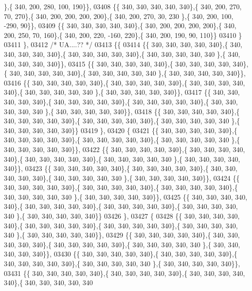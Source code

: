 \begin{DoxyCode}
      \},\{ 340, 200, 280, 100, 190\}\},
03408 \{\{ 340, 340, 340, 340, 340\},\{ 340, 200, 270,  70, 270\},\{ 340, 200, 200, 200, 200\},\{ 340, 200, 270,  30, 230
      \},\{ 340, 200, 100, -290,  90\}\},
03409 \{\{ 340, 340, 340, 340, 340\},\{ 340, 200, 200, 200, 200\},\{ 340, 200, 250,  70, 160\},\{ 340, 200, 220, -160, 
      220\},\{ 340, 200, 190,  90, 110\}\}
03410 \}
03411 \},
03412 \textcolor{comment}{/* UA....?? */}
03413 \{\{
03414 \{\{ 340, 340, 340, 340, 340\},\{ 340, 340, 340, 340, 340\},\{ 340, 340, 340, 340, 340\},\{ 340, 340, 340, 340, 340
      \},\{ 340, 340, 340, 340, 340\}\},
03415 \{\{ 340, 340, 340, 340, 340\},\{ 340, 340, 340, 340, 340\},\{ 340, 340, 340, 340, 340\},\{ 340, 340, 340, 340, 340
      \},\{ 340, 340, 340, 340, 340\}\},
03416 \{\{ 340, 340, 340, 340, 340\},\{ 340, 340, 340, 340, 340\},\{ 340, 340, 340, 340, 340\},\{ 340, 340, 340, 340, 340
      \},\{ 340, 340, 340, 340, 340\}\},
03417 \{\{ 340, 340, 340, 340, 340\},\{ 340, 340, 340, 340, 340\},\{ 340, 340, 340, 340, 340\},\{ 340, 340, 340, 340, 340
      \},\{ 340, 340, 340, 340, 340\}\},
03418 \{\{ 340, 340, 340, 340, 340\},\{ 340, 340, 340, 340, 340\},\{ 340, 340, 340, 340, 340\},\{ 340, 340, 340, 340, 340
      \},\{ 340, 340, 340, 340, 340\}\}
03419 \},
03420 \{
03421 \{\{ 340, 340, 340, 340, 340\},\{ 340, 340, 340, 340, 340\},\{ 340, 340, 340, 340, 340\},\{ 340, 340, 340, 340, 340
      \},\{ 340, 340, 340, 340, 340\}\},
03422 \{\{ 340, 340, 340, 340, 340\},\{ 340, 340, 340, 340, 340\},\{ 340, 340, 340, 340, 340\},\{ 340, 340, 340, 340, 340
      \},\{ 340, 340, 340, 340, 340\}\},
03423 \{\{ 340, 340, 340, 340, 340\},\{ 340, 340, 340, 340, 340\},\{ 340, 340, 340, 340, 340\},\{ 340, 340, 340, 340, 340
      \},\{ 340, 340, 340, 340, 340\}\},
03424 \{\{ 340, 340, 340, 340, 340\},\{ 340, 340, 340, 340, 340\},\{ 340, 340, 340, 340, 340\},\{ 340, 340, 340, 340, 340
      \},\{ 340, 340, 340, 340, 340\}\},
03425 \{\{ 340, 340, 340, 340, 340\},\{ 340, 340, 340, 340, 340\},\{ 340, 340, 340, 340, 340\},\{ 340, 340, 340, 340, 340
      \},\{ 340, 340, 340, 340, 340\}\}
03426 \},
03427 \{
03428 \{\{ 340, 340, 340, 340, 340\},\{ 340, 340, 340, 340, 340\},\{ 340, 340, 340, 340, 340\},\{ 340, 340, 340, 340, 340
      \},\{ 340, 340, 340, 340, 340\}\},
03429 \{\{ 340, 340, 340, 340, 340\},\{ 340, 340, 340, 340, 340\},\{ 340, 340, 340, 340, 340\},\{ 340, 340, 340, 340, 340
      \},\{ 340, 340, 340, 340, 340\}\},
03430 \{\{ 340, 340, 340, 340, 340\},\{ 340, 340, 340, 340, 340\},\{ 340, 340, 340, 340, 340\},\{ 340, 340, 340, 340, 340
      \},\{ 340, 340, 340, 340, 340\}\},
03431 \{\{ 340, 340, 340, 340, 340\},\{ 340, 340, 340, 340, 340\},\{ 340, 340, 340, 340, 340\},\{ 340, 340, 340, 340, 340

\end{DoxyCode}
